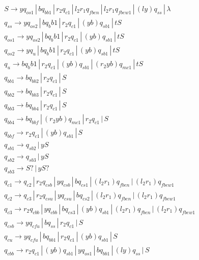 \documentclass{article}
\begin{document}
\begin{mylist}
\begin{align*}
&S \rightarrow yq_{os1} \, | \, bq_{bb1} \, | \, r_2q_{c1} \, | \, l_2r_1q_{fben} \, | \, l_2r_1q_{fbew1} \, | \, (ly)q_{ss} \, | \, \lambda \\
&q_{ss} \rightarrow yq_{os2} \, | \, b{q_bb1} \, | \, r_2q_{c1} \, | \, (yb)q_{sb1} \, | \, tS\\
&q_{os1} \rightarrow yq_{os2} \, | \, b{q_bb1} \, | \, r_2q_{c1} \, | \, (yb)q_{sb1} \, | \, tS\\
&q_{os2} \rightarrow yq_{u} \, | \, b{q_bb1} \, | \, r_2q_{c1} \, | \, (yb)q_{sb1} \, | \, tS\\
&q_{u} \rightarrow b{q_bb1} \, | \, r_2q_{c1} \, | \,(yb)q_{sb1} \, | \, (r_2yb)q_{mc1} \, | \, tS\\
&q_{bb1} \rightarrow bq_{bb2} \, | \, r_2q_{c1} \, | \, S \\ 
&q_{bb2} \rightarrow bq_{bb3} \, | \, r_2q_{c1} \, | \, S \\ 
&q_{bb3} \rightarrow bq_{bb4} \, | \, r_2q_{c1} \, | \, S \\ 
&q_{bb4} \rightarrow bq_{bbf} \, | \, (r_2yb)q_{mc1} \, | \, r_2q_{c1} \, | \, S \\ 
&q_{bbf} \rightarrow r_2q_{c1} \, | \, (yb)q_{sb1} \, | \, S \\ 
&q_{sb1} \rightarrow q_{sb2} \, | \, yS \\ 
&q_{sb2} \rightarrow q_{sb3} \, | \, yS \\ 
&q_{sb3} \rightarrow S? \, | \, yS? \\ 
&q_{c1} \rightarrow q_{c2} \, | \,  r_2q_{csb} \, | \, yq_{csb} \, | \, bq_{cs1} \, | \, (l_2r_1)q_{fben} \, | \, (l_2r_1)q_{fbew1}\\ 
&q_{c2} \rightarrow q_{c3} \, | \,  r_2q_{csu} \, | \, yq_{csu} \, | \, bq_{cs2} \, | \, (l_2r_1)q_{fben} \, | \, (l_2r_1)q_{fbew1}\\ 
&q_{c3} \rightarrow r_2q_{cbb} \, | \,  yq_{cbb} \, | \, bq_{cs3} \, | \, (yb)q_{sb1} \, | \, (l_2r_1)q_{fben} \, | \, (l_2r_1)q_{fbew1}\ \\ 
&q_{csb} \rightarrow yq_{cfu} \, | \,  bq_{ss} \, | \, r_2q_{c1} \, | \, S \\ 
&q_{cu} \rightarrow yq_{cfu} \, | \,  bq_{bb1} \, | \, r_2q_{c1} \, | \, (yb)q_{sb1} \, | \, S \\ 
&q_{cbb} \rightarrow r_2q_{c1} \, | \,  (yb)q_{sb1} \, | \, yq_{os1} \, | \, bq_{bb1} \, | \, (ly)q_{ss} \, | \, S \\ 

\end{align*}
\end{mylist}
\end{document}
